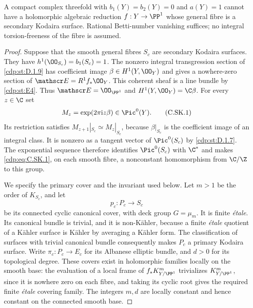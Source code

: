 
\begin{proposition}\label{cdp:st:C.3.9}

A compact complex threefold with $b_1(Y)=b_2(Y)=0$ and
$a(Y)=1$ cannot have a holomorphic algebraic reduction
$f:Y\to\PP^1$ whose general fibre is a secondary Kodaira
surface. Rational Betti-number vanishing suffices; no integral
torsion-freeness of the fibre is assumed.
\end{proposition}
\begin{proof}
Suppose that the smooth general fibres $S_c$ are secondary
Kodaira surfaces. They have $h^1(\OO_{S_c})=b_1(S_c)=1$.
The nonzero integral transgression section of \ref{cdp:st:D.1.9} has
coefficient image $\beta\in H^1(Y,\OO_Y)$ and gives a
nowhere-zero section of $\mathscr E=R^1f_*\OO_Y$.
This coherent sheaf is a line bundle by \ref{cdp:st:E4}. Thus
$\mathscr E=\OO_{\PP^1}$ and
$H^1(Y,\OO_Y)=\C\beta$. For every $z\in\C$ set
\[
 M_z=\exp(2\pi\mathrm i z\beta)\in\Pic^0(Y).
\tag{C.SK.1}\label{cdp:eq:C.SK.1}
\]
Its restriction satisfies $M_{z+1}|_{S_c}\simeq M_z|_{S_c}$,
because $\beta|_{S_c}$ is the coefficient image of an
integral class. It is nonzero as a tangent vector of
$\Pic^0(S_c)$ by \ref{cdp:st:D.1.7}. The exponential sequence therefore
identifies $\Pic^0(S_c)$ with $\C^*$ and makes \eqref{cdp:eq:C.SK.1}, on
each smooth fibre, a nonconstant homomorphism from
$\C/\Z$ to this group.

We specify the primary cover and the invariant used below.
Let $m>1$ be the order of $K_{S_c}$, and let
\[
 p_c:P_c\longrightarrow S_c
\]
be its connected cyclic canonical cover, with deck group
$G=\mu_m$. It is finite \emph{\'etale}. Its canonical bundle
is trivial, and it is non-K\"ahler, because a finite
\emph{\'etale} quotient of a K\"ahler surface is K\"ahler
by averaging a K\"ahler form. The classification of
surfaces with trivial canonical bundle consequently makes
$P_c$ a primary Kodaira surface. Write
$\pi_c:P_c\to E_c$ for its Albanese elliptic bundle, and
$d>0$ for its topological degree. These covers exist in
holomorphic families locally on the smooth base: the
evaluation of a local frame of $f_*K_{Y/\PP^1}^{m}$
trivializes $K_{Y/\PP^1}^{m}$, since it is nowhere zero on
each fibre, and taking its cyclic root gives the required
finite \emph{\'etale} covering family. The integers $m,d$
are locally constant and hence constant on the connected
smooth base.


\end{proof}
